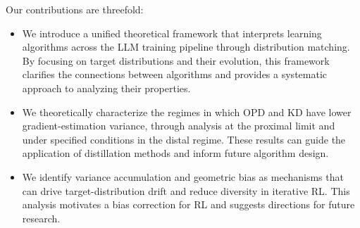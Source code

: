 %
%


Our contributions are threefold:

\begin{itemize}
\item We introduce a unified theoretical framework that interprets learning algorithms across the LLM training pipeline through distribution matching. By focusing on target distributions and their evolution, this framework clarifies the connections between algorithms and provides a systematic approach to analyzing their properties.
\item We theoretically characterize the regimes in which OPD and KD have lower gradient-estimation variance, through analysis at the proximal limit and under specified conditions in the distal regime. These results can guide the application of distillation methods and inform future algorithm design.
\item We identify variance accumulation and geometric bias as mechanisms that can drive target-distribution drift and reduce diversity in iterative RL. This analysis motivates a bias correction for RL and suggests directions for future research.
\end{itemize}
